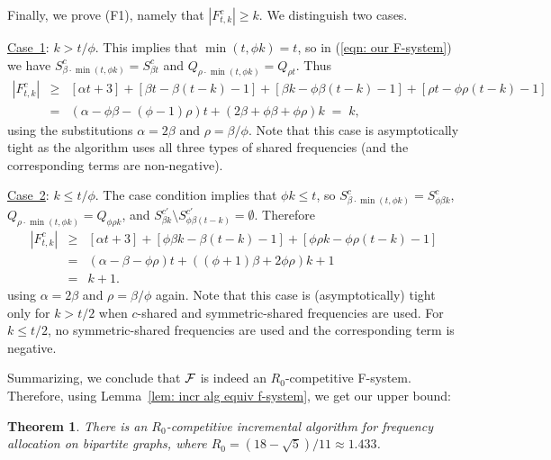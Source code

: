 \documentclass[11pt]{article}
\newcommand{\calF}{{\cal F}}
\newcommand{\mycase}[1]{\mbox{{\underline{Case #1}}:\/}}
\newtheorem{theorem}{Theorem}[section]
\begin{document}
Finally, we prove (F1), namely that $|F^c_{t,k}|\ge k$. We
distinguish two cases.
\begin{description}

\item{{\mycase{1}}} $k>t/\phi$. 
This implies that $\min(t, \phi k) = t$, so in (\ref{eqn: our F-system}) we have
$S^c_{\beta\cdot\min(t,\phi k)}=S^c_{\beta t}$ and $Q_{\rho\cdot\min(t,\phi k)}=Q_{\rho t}$.
Thus
\begin{eqnarray*}
|F^c_{t,k}| &\geq &	[ \alpha t+3 ] + [ \beta t- \beta(t-k)-1 ] + 
	[ \beta k-\phi\beta(t-k)-1 ] + [\rho t -\phi\rho (t-k)-1 ] 
			\\ 
&=& (\alpha-\phi\beta-(\phi-1)\rho)t+ (2\beta+\phi\beta+\phi\rho)k
\;=\; k,
\end{eqnarray*}
using the substitutions $\alpha=2\beta$ and $\rho=\beta/\phi$.
Note that this case is asymptotically
tight as the algorithm uses all
three types of shared frequencies (and the corresponding terms are
non-negative). 

\item{{\mycase{2}}} $k\leq t/\phi$. 
The case condition implies that
$\phi k \le t$, so $S^c_{\beta\cdot\min(t,\phi k)}=S^c_{\phi\beta k}$,
$Q_{\rho\cdot\min(t,\phi k)}=Q_{\phi\rho k}$, and 
$S^{c'}_{\beta k} \setminus S^{c'}_{\phi\beta(t-k)} = \emptyset$. Therefore
\begin{eqnarray*}
|F^c_{t,k}| &\geq& [ \alpha t+ 3 ] + [ \phi\beta k- \beta (t-k)-1 ]
           + [\phi\rho k -\phi\rho (t-k)-1 ] 
\\
		&=&  (\alpha - \beta-\phi\rho) t + ((\phi+1)\beta+2\phi\rho) k+1
		\\
		&=& k+1.
\end{eqnarray*}
using $\alpha=2\beta$ and $\rho=\beta/\phi$ again. Note that this case is
(asymptotically) tight only for $k>t/2$ when $c$-shared and
symmetric-shared frequencies are used. For $k\leq t/2$, no
symmetric-shared frequencies are used and the corresponding term is
negative. 
\end{description}

Summarizing, we conclude that $\calF$ is indeed an $R_0$-competitive
F-system. Therefore, using Lemma~\ref{lem: incr alg equiv f-system}, we get
our upper bound:



\begin{theorem}
There is an $R_0$-competitive incremental
algorithm for frequency allocation on bipartite graphs, where
$R_0=(18-\sqrt{5})/11 \approx 1.433$.
\end{theorem}
\end{document}
